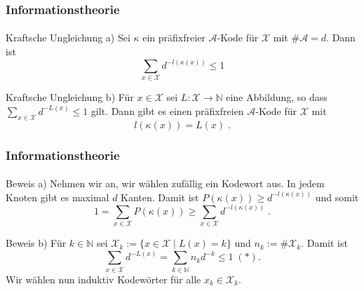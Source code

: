 \documentclass{beamer}
\begin{document}
\begin{frame}
    \frametitle{Informationstheorie}
\framesubtitle{}

\begin{block}{Kraftsche Ungleichung a)}
Sei $\kappa$ ein präfixfreier $\mathcal{A}$-Kode für $\mathcal{X}$ mit $\# \mathcal{A} = d$. Dann ist
$$ \sum_{x \in \mathcal{X} }  d^{-l( \kappa(x))} \leq 1$$
\end{block}

\begin{block}{Kraftsche Ungleichung b)}
Für $x \in \mathcal{X}$ sei $L : \mathcal{X} \to \mathbb{N}$ eine Abbildung, so dass $ \sum_{x \in \mathcal{X} }  d^{-L(x)} \leq 1$ gilt. Dann gibt es einen präfixfreien  $\mathcal{A}$-Kode für $\mathcal{X}$ mit 
$$ l(\kappa(x)) = L(x) \; .$$
\end{block}


 \end{frame}

\begin{frame}
    \frametitle{Informationstheorie}
\framesubtitle{}

\begin{block}{Beweis a)}
Nehmen wir an, wir wählen zufällig ein Kodewort aus.
In jedem Knoten gibt es maximal $d$ Kanten. Damit ist $P(\kappa(x)) \geq d^{-l(\kappa(x))}$ und somit
$$ 1 = \sum_{x \in \mathcal{X}} P(\kappa(x)) \geq  \sum_{x \in \mathcal{X}} d^{-l(\kappa(x))} \; .$$
\end{block}

\begin{block}{Beweis b)}
Für $k \in \mathbb{N}$ sei $\mathcal{X}_k := \{ x \in \mathcal{X} \;  |  \; L(x) = k\}$  und $n_k := \# \mathcal{X}_k$.
Damit ist 
$$  \sum_{x \in \mathcal{X} }  d^{-L(x)} =   \sum_{k \in \mathbb{N}}  n_k d^{-k} \leq 1\;(*) .$$
Wir wählen nun induktiv Kodewörter für alle $x_k \in \mathcal{X}_k$. 
\end{block}

 \end{frame}
\end{document}

